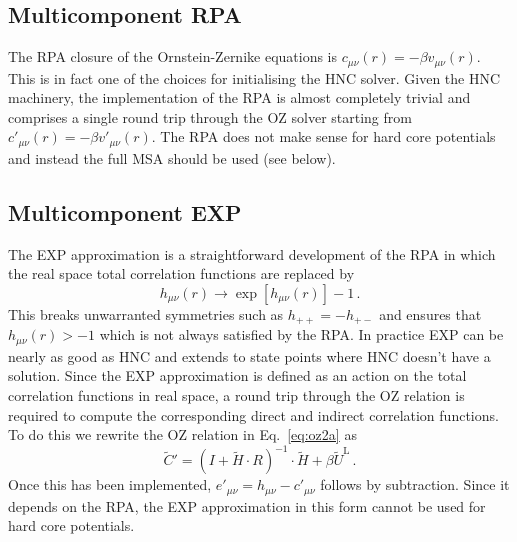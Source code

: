 \documentclass[12pt,a4paper]{article}
\newcommand{\lr}{^{\mathrm{L}}}
\newcommand{\Eqref}[1]{Eq.~\eqref{#1}}
\begin{document}
\subsection{Multicomponent RPA}
%
The RPA closure of the Ornstein-Zernike equations is
$c_{\mu\nu}(r)=-\beta v_{\mu\nu}(r)$.  This is in fact one of the
choices for initialising the HNC solver.  Given the HNC machinery, the
implementation of the RPA is almost completely trivial and comprises a
single round trip through the OZ solver starting from
$c'_{\mu\nu}(r)=-\beta v'_{\mu\nu}(r)$.  The RPA does not make sense
for hard core potentials and instead the full MSA should be used (see
below).

\subsection{Multicomponent EXP}
%
The EXP approximation is a straightforward development of the RPA in
which the real space total correlation functions are replaced by
%
\begin{equation}
h_{\mu\nu}(r)\to \exp[h_{\mu\nu}(r)]-1\,.\label{eq:exp}
\end{equation}
%
This breaks unwarranted symmetries such as $h_{++}=-h_{+-}$ and
ensures that $h_{\mu\nu}(r)>-1$ which is not always satisfied by the
RPA.  In practice EXP can be nearly as good as HNC and extends to
state points where HNC doesn't have a solution.  Since the EXP
approximation is defined as an action on the total correlation
functions in real space, a round trip through the OZ relation is
required to compute the corresponding direct and indirect correlation
functions.  To do this we rewrite the OZ relation in \Eqref{eq:oz2a} as
%
\begin{equation}
{\tilde C}' = (I+{\tilde H}\cdot R)^{-1}\cdot{\tilde H}
 + \beta{\tilde U}\lr\,.
\label{eq:ozndb}
\end{equation}
%
Once this has been implemented, $e'_{\mu\nu}= h_{\mu\nu} -
c'_{\mu\nu}$ follows by subtraction.  Since it depends on the RPA, the
EXP approximation in this form cannot be used for hard core
potentials.
\end{document}
